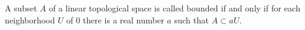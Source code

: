 A subset $A$ of a linear topological space is called bounded if and only if for each neighborhood $U$ of $0$ there is a real number $a$ such that $A \subset aU$.
